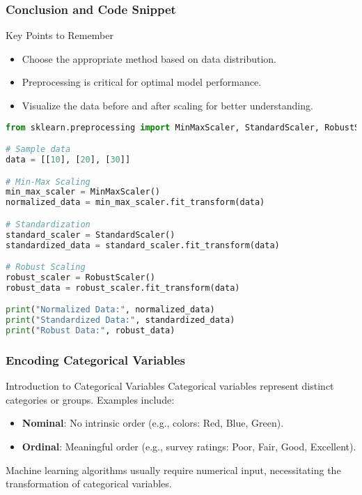 \documentclass[aspectratio=169]{beamer}
\begin{document}
\begin{frame}[fragile]
    \frametitle{Conclusion and Code Snippet}
    \begin{block}{Key Points to Remember}
        \begin{itemize}
            \item Choose the appropriate method based on data distribution.
            \item Preprocessing is critical for optimal model performance.
            \item Visualize the data before and after scaling for better understanding.
        \end{itemize}
    \end{block}

    \begin{lstlisting}[language=Python, caption={Normalization and Scaling Example}]
from sklearn.preprocessing import MinMaxScaler, StandardScaler, RobustScaler

# Sample data
data = [[10], [20], [30]]

# Min-Max Scaling
min_max_scaler = MinMaxScaler()
normalized_data = min_max_scaler.fit_transform(data)

# Standardization
standard_scaler = StandardScaler()
standardized_data = standard_scaler.fit_transform(data)

# Robust Scaling
robust_scaler = RobustScaler()
robust_data = robust_scaler.fit_transform(data)

print("Normalized Data:", normalized_data)
print("Standardized Data:", standardized_data)
print("Robust Data:", robust_data)
    \end{lstlisting}
\end{frame}

\begin{frame}
    \frametitle{Encoding Categorical Variables}
    \begin{block}{Introduction to Categorical Variables}
        Categorical variables represent distinct categories or groups. 
        Examples include:
        \begin{itemize}
            \item \textbf{Nominal}: No intrinsic order (e.g., colors: Red, Blue, Green).
            \item \textbf{Ordinal}: Meaningful order (e.g., survey ratings: Poor, Fair, Good, Excellent).
        \end{itemize}
        Machine learning algorithms usually require numerical input, necessitating the transformation of categorical variables.
    \end{block}
\end{frame}
\end{document}
